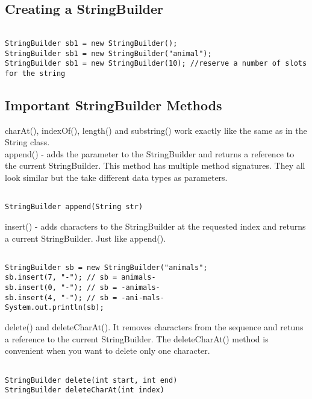 \documentclass[a4paper]{report}   %
\begin{document}
\subsection{Creating a StringBuilder}

\begin{lstlisting}

StringBuilder sb1 = new StringBuilder();
StringBuilder sb1 = new StringBuilder("animal");
StringBuilder sb1 = new StringBuilder(10); //reserve a number of slots for the string

\end{lstlisting}

\subsection{Important StringBuilder Methods}

charAt(), indexOf(), length() and substring() work exactly like the same as in the String class.\\

append() - adds the parameter to the StringBuilder and returns a reference to the current StringBuilder. This method has multiple method signatures. They all look similar but the take different data types as parameters.

\begin{lstlisting}

StringBuilder append(String str)

\end{lstlisting}

insert() - adds characters to the StringBuilder at the requested index and returns a current StringBuilder. Just like append().

\begin{lstlisting}

StringBuilder sb = new StringBuilder("animals";
sb.insert(7, "-"); // sb = animals-
sb.insert(0, "-"); // sb = -animals-
sb.insert(4, "-"); // sb = -ani-mals-
System.out.println(sb);

\end{lstlisting}

delete() and deleteCharAt(). It removes characters from the sequence and retuns a reference to the current StringBuilder. The deleteCharAt() method is convenient when you want to delete only one character.

\begin{lstlisting}

StringBuilder delete(int start, int end)
StringBuilder deleteCharAt(int index)

\end{lstlisting}
\end{document}

